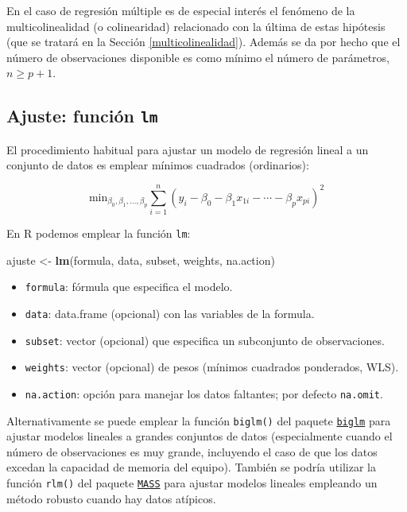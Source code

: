 \documentclass[
]{book}
\newenvironment{Shaded}{\begin{snugshade}}{\end{snugshade}}
\newcommand{\KeywordTok}[1]{\textcolor[rgb]{0.13,0.29,0.53}{\textbf{#1}}}
\newcommand{\NormalTok}[1]{#1}
\newcommand{\StringTok}[1]{\textcolor[rgb]{0.31,0.60,0.02}{#1}}
\theoremstyle{break}
\theoremstyle{definition}
\theoremstyle{definition}
\theoremstyle{definition}
\theoremstyle{remark}
\begin{document}
En el caso de regresión múltiple es de especial interés el fenómeno de la multicolinealidad (o colinearidad) relacionado con la última de estas hipótesis (que se tratará en la Sección \ref{multicolinealidad}).
Además se da por hecho que el número de observaciones disponible es como mínimo el número de parámetros, \(n \geq p + 1\).

\hypertarget{ajuste-funciuxf3n-lm}{%
\subsection{\texorpdfstring{Ajuste: función \texttt{lm}}{Ajuste: función lm}}\label{ajuste-funciuxf3n-lm}}

El procedimiento habitual para ajustar un modelo de regresión lineal a un conjunto de datos es emplear mínimos cuadrados (ordinarios):

\[\mbox{min}_{\beta_{0},\beta_{1},\ldots,\beta_{p}}  \sum\limits_{i=1}^{n}\left(  y_{i} - \beta_0 - \beta_1 x_{1i} - \cdots - \beta_p x_{pi} \right)^{2}\]

En R podemos emplear la función \texttt{lm}:

\begin{Shaded}
\begin{Highlighting}[]
\NormalTok{ajuste <-}\StringTok{ }\KeywordTok{lm}\NormalTok{(formula, data, subset, weights, na.action)}
\end{Highlighting}
\end{Shaded}

\begin{itemize}
\item
  \texttt{formula}: fórmula que especifica el modelo.
\item
  \texttt{data}: data.frame (opcional) con las variables de la formula.
\item
  \texttt{subset}: vector (opcional) que especifica un subconjunto de observaciones.
\item
  \texttt{weights}: vector (opcional) de pesos (mínimos cuadrados ponderados, WLS).
\item
  \texttt{na.action}: opción para manejar los datos faltantes; por defecto \texttt{na.omit}.
\end{itemize}

Alternativamente se puede emplear la función \texttt{biglm()} del paquete \href{https://CRAN.R-project.org/package=biglm}{\texttt{biglm}} para ajustar modelos lineales a grandes conjuntos de datos (especialmente cuando el número de observaciones es muy grande, incluyendo el caso de que los datos excedan la capacidad de memoria del equipo).
También se podría utilizar la función \texttt{rlm()} del paquete \href{https://CRAN.R-project.org/package=MASS}{\texttt{MASS}} para ajustar modelos lineales empleando un método robusto cuando hay datos atípicos.
\end{document}
